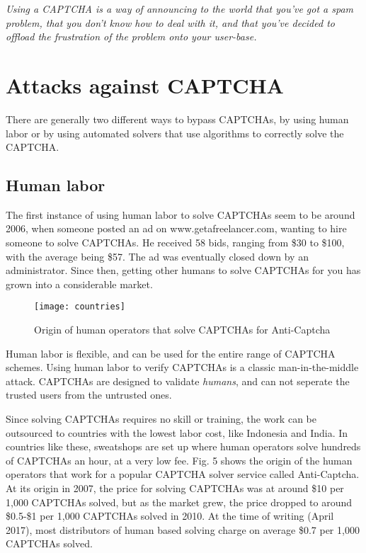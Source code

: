 \documentclass[a4paper]{IEEEtran}
\begin{document}
\begin{displayquote}
\textit{Using a CAPTCHA is a way of announcing to the world that you’ve got a spam problem, that you don’t know how to deal with it, and that you’ve decided to offload the frustration of the problem onto your user-base.}
\end{displayquote} 

\section{Attacks against CAPTCHA}
There are generally two different ways to bypass CAPTCHAs, by using human labor or by using automated solvers that use algorithms to correctly solve the CAPTCHA.

\subsection{Human labor}
The first instance of using human labor to solve CAPTCHAs seem to be around 2006, when someone posted an ad on www.getafreelancer.com, wanting to hire someone to solve CAPTCHAs. He received 58 bids, ranging from \$30 to \$100, with the average being \$57. The ad was eventually closed down by an administrator\cite{firstinstance}. Since then, getting other humans to solve CAPTCHAs for you has grown into a considerable market.

\begin{figure}
\centering
\texttt{[image: countries]}
\caption[Origin of human operators]{Origin of human operators that solve CAPTCHAs for Anti-Captcha\cite{anticaptcha}}
\label{Origin of human operators}
\end{figure}

Human labor is flexible, and can be used for the entire range of CAPTCHA schemes. Using human labor to verify CAPTCHAs is a classic man-in-the-middle attack. CAPTCHAs are designed to validate \textit{humans}, and can not seperate the trusted users from the untrusted ones.

Since solving CAPTCHAs requires no skill or training, the work can be outsourced to countries with the lowest labor cost, like Indonesia and India. In countries like these, sweatshops are set up where human operators solve hundreds of CAPTCHAs an hour, at a very low fee. Fig. 5 shows the origin of the human operators that work for a popular CAPTCHA solver service called Anti-Captcha. At its origin in 2007, the price for solving CAPTCHAs was at around \$10 per 1,000 CAPTCHAs solved, but as the market grew, the price dropped to around \$0.5-\$1 per 1,000 CAPTCHAs solved in 2010. At the time of writing (April 2017), most distributors of human based solving charge on average \$0.7 per 1,000 CAPTCHAs solved.
\end{document}
